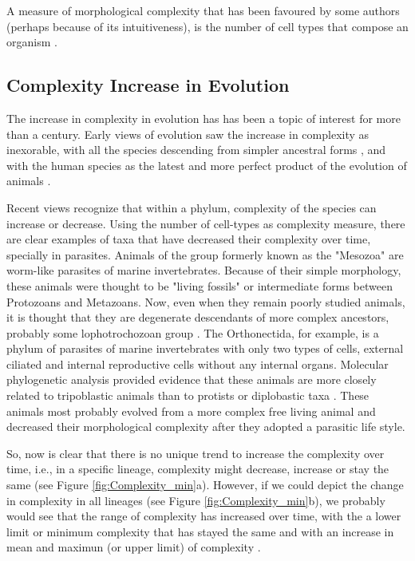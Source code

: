 
A measure of morphological complexity that has been favoured by some authors (perhaps because of its intuitiveness), is the number of cell types that compose an organism 
	\citep{Bell1997,Bonner2004,McShea1996}.


\subsection{Complexity Increase in Evolution}

The increase in complexity in evolution has has been a topic of interest for more than a century.
Early views of evolution saw the increase in complexity as inexorable, with all the species descending from simpler ancestral forms \citep{lamarck1809zoo,haeckel1874menschen}, and with the human species as the latest and more perfect product of the evolution of animals \citep{haeckel1874menschen}.


Recent views recognize that within a phylum, complexity of the species can increase or decrease.
Using the number of cell-types as complexity measure, there are clear examples of taxa that have decreased their complexity over time, specially in parasites.
Animals of the group formerly known as the "Mesozoa" are worm-like parasites of marine invertebrates.
Because of their simple morphology, these animals were thought to be "living fossils" or intermediate forms between Protozoans and Metazoans.
Now, even when they remain poorly studied animals, it is thought that they are degenerate descendants of more complex ancestors, probably some lophotrochozoan group \citep{Arthur2010}.
The Orthonectida, for example, is a phylum of parasites of marine invertebrates with only two types of cells, external ciliated and internal reproductive cells without any internal organs. 
Molecular phylogenetic analysis provided evidence that these animals are more closely related to tripoblastic animals than to protists or diplobastic taxa \citep{Hanelt1996}.
These animals most probably evolved from a more complex free living animal and decreased their morphological complexity after they adopted a parasitic life style.

So, now is clear that there is no unique trend to increase the complexity over time, i.e., in a specific lineage, complexity might decrease, increase or stay the same (see Figure \ref{fig:Complexity_min}a).
However, if we could depict the change in complexity in all lineages (see Figure \ref{fig:Complexity_min}b), we probably would see that the range of complexity has increased over time, with the a lower limit or minimum complexity that has stayed the same and with an increase in mean and maximun (or upper limit) of complexity \citep{McShea1996,Arthur2010}.

